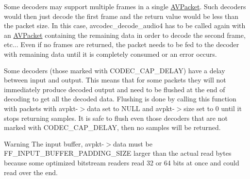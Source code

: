 Some decoders may support multiple frames in a single \hyperlink{struct_a_v_packet}{A\+V\+Packet}. Such decoders would then just decode the first frame and the return value would be less than the packet size. In this case, avcodec\+\_\+decode\+\_\+audio4 has to be called again with an \hyperlink{struct_a_v_packet}{A\+V\+Packet} containing the remaining data in order to decode the second frame, etc... Even if no frames are returned, the packet needs to be fed to the decoder with remaining data until it is completely consumed or an error occurs.

Some decoders (those marked with C\+O\+D\+E\+C\+\_\+\+C\+A\+P\+\_\+\+D\+E\+L\+AY) have a delay between input and output. This means that for some packets they will not immediately produce decoded output and need to be flushed at the end of decoding to get all the decoded data. Flushing is done by calling this function with packets with avpkt-\/$>$data set to N\+U\+LL and avpkt-\/$>$size set to 0 until it stops returning samples. It is safe to flush even those decoders that are not marked with C\+O\+D\+E\+C\+\_\+\+C\+A\+P\+\_\+\+D\+E\+L\+AY, then no samples will be returned.

\begin{DoxyWarning}{Warning}
The input buffer, avpkt-\/$>$data must be F\+F\+\_\+\+I\+N\+P\+U\+T\+\_\+\+B\+U\+F\+F\+E\+R\+\_\+\+P\+A\+D\+D\+I\+N\+G\+\_\+\+S\+I\+ZE larger than the actual read bytes because some optimized bitstream readers read 32 or 64 bits at once and could read over the end.
\end{DoxyWarning}

